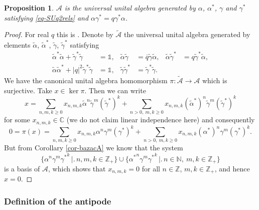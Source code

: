 \documentclass[12pt,reqno,a4paper]{amsart}
\newtheorem{proposition}{Proposition}[section]
\theoremstyle{definition}
\newcommand{\I}{\mathds{1}}
\newcommand{\CC}{\mathbb{C}}
\newcommand{\NN}{\mathbb{N}}
\newcommand{\ZZ}{\mathbb{Z}}
\newcommand{\cA}{\mathscr{A}}
\numberwithin{equation}{section}
\begin{document}
\begin{proposition}\label{prop-lemma13}
$\cA$ is the universal unital algebra generated by $\alpha$, $\alpha^*$, $\gamma$ and $\gamma^*$ satisfying \eqref{eq-SUq2rels} and $\alpha\gamma^*=q\gamma^*\alpha$.
\end{proposition}

\begin{proof}
For real $q$ this is \cite[Theorem 1.3]{su2}. Denote by $\widetilde{\cA}$ the universal unital algebra generated by elements $\tilde{\alpha}$, $\tilde{\alpha}^*$, $\tilde{\gamma}$, $\tilde{\gamma}^*$ satisfying
\begin{align*}
\tilde{\alpha}^*\tilde{\alpha}+\tilde{\gamma}^*\tilde{\gamma}&=\I,&\tilde{\alpha}\tilde{\gamma}&=\overline{q}\tilde{\gamma}\tilde{\alpha},&\tilde{\alpha}\tilde{\gamma}^*&=q\tilde{\gamma}^*\tilde{\alpha},\\
\tilde{\alpha}\tilde{\alpha}^*+|q|^2\tilde{\gamma}^*\tilde{\gamma}&=\I,&\tilde{\gamma}\tilde{\gamma}^*&=\tilde{\gamma}^*\tilde{\gamma}.
\end{align*}
We have the canonical unital algebra homomorphism $\pi\colon\widetilde{\cA}\to\cA$ which is surjective. Take $x\in\ker{\pi}$. Then we can write
\[
x=\sum_{n,m,k\ge 0}x_{n,m,k}\tilde{\alpha}^n\tilde{\gamma}^m(\tilde{\gamma}^*)^k+
\sum_{n>0,\:m,k\ge 0}x_{n,m,k}(\tilde{\alpha}^*)^n\tilde{\gamma}^m(\tilde{\gamma}^*)^k
\]
for some $x_{n,m,k}\in\CC$ (we do not claim linear independence here) and consequently
\[
0=\pi(x)=
\sum_{n,m,k\ge 0}x_{n,m,k}\alpha^n\gamma^m(\gamma^*)^k+
\sum_{n>0,\:m,k\ge 0}x_{n,m,k}(\alpha^*)^n\gamma^m(\gamma^*)^k.
\]
But from Corollary \ref{cor-bazacA} we know that the system
\[
\bigl\{\alpha^n\gamma^m{\gamma^*}^k\,\bigr|\bigl.\,n,m,k\in\ZZ_+\bigr\}\cup\bigl\{{\alpha^*}^n\gamma^m{\gamma^*}^k\,\bigr|\bigl.\,n\in\NN,\:m,k\in\ZZ_+\bigr\}
\]
is a basis of $\cA$, which shows that $x_{n,m,k}=0$ for all $n\in\ZZ$, $m,k\in\ZZ_+$, and hence $x=0$.
\end{proof}

\subsubsection{Definition of the antipode}\label{sect-Antipode}
\end{document}
